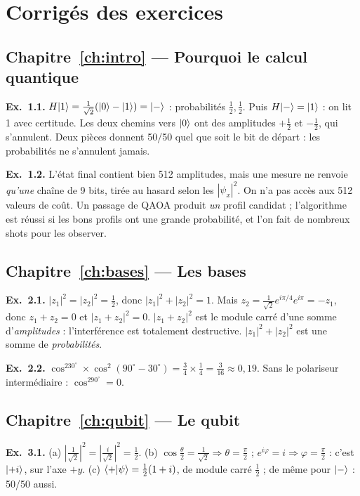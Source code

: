 \chapter{Corrigés des exercices}\label{annexe:corriges}

\section*{Chapitre~\ref{ch:intro} — Pourquoi le calcul quantique}
\textbf{Ex.~1.1.} $H\lvert 1\rangle=\tfrac1{\sqrt2}(\lvert 0\rangle-\lvert 1\rangle)=\lvert -\rangle$ : probabilités $\tfrac12,\tfrac12$. Puis $H\lvert -\rangle=\lvert 1\rangle$ : on lit 1 avec certitude. Les deux chemins vers $\lvert 0\rangle$ ont des amplitudes $+\tfrac12$ et $-\tfrac12$, qui s'annulent. Deux pièces donnent 50/50 quel que soit le bit de départ : les probabilités ne s'annulent jamais.

\textbf{Ex.~1.2.} L'état final contient bien 512 amplitudes, mais une mesure ne renvoie \emph{qu'une} chaîne de 9 bits, tirée au hasard selon les $|\psi_x|^2$. On n'a pas accès aux 512 valeurs de coût. Un passage de QAOA produit \emph{un} profil candidat ; l'algorithme est réussi si les bons profils ont une grande probabilité, et l'on fait de nombreux shots pour les observer.

\section*{Chapitre~\ref{ch:bases} — Les bases}
\textbf{Ex.~2.1.} $|z_1|^2=|z_2|^2=\tfrac12$, donc $|z_1|^2+|z_2|^2=1$. Mais $z_2=\tfrac1{\sqrt2}e^{i\pi/4}e^{i\pi}=-z_1$, donc $z_1+z_2=0$ et $|z_1+z_2|^2=0$. $|z_1+z_2|^2$ est le module carré d'une somme d'\emph{amplitudes} : l'interférence est totalement destructive. $|z_1|^2+|z_2|^2$ est une somme de \emph{probabilités}.

\textbf{Ex.~2.2.} $\cos^230^\circ\times\cos^2(90^\circ-30^\circ)=\tfrac34\times\tfrac14=\tfrac3{16}\approx0{,}19$. Sans le polariseur intermédiaire : $\cos^290^\circ=0$.

\section*{Chapitre~\ref{ch:qubit} — Le qubit}
\textbf{Ex.~3.1.} (a) $|\tfrac1{\sqrt2}|^2=|\tfrac i{\sqrt2}|^2=\tfrac12$. (b) $\cos\tfrac\theta2=\tfrac1{\sqrt2}\Rightarrow\theta=\tfrac\pi2$ ; $e^{i\varphi}=i\Rightarrow\varphi=\tfrac\pi2$ : c'est $\lvert +i\rangle$, sur l'axe $+y$. (c) $\langle +\vert \psi\rangle=\tfrac12(1+i)$, de module carré $\tfrac12$ ; de même pour $\lvert -\rangle$ : 50/50 aussi.

